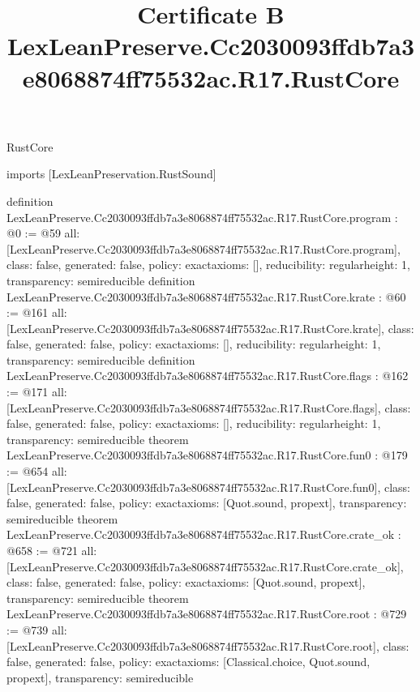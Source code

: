\begin{lexlean}{RustCore}
\title{Certificate B LexLeanPreserve.Cc2030093ffdb7a3e8068874ff75532ac.R17.RustCore}
\begin{coremodule}
imports [LexLeanPreservation.RustSound]

definition LexLeanPreserve.Cc2030093ffdb7a3e8068874ff75532ac.R17.RustCore.program : @0 := @59 {
  all: [LexLeanPreserve.Cc2030093ffdb7a3e8068874ff75532ac.R17.RustCore.program],
  class: false,
  generated: false,
  policy: exact{axioms: []},
  reducibility: regular{height: 1},
  transparency: semireducible
}
definition LexLeanPreserve.Cc2030093ffdb7a3e8068874ff75532ac.R17.RustCore.krate : @60 := @161 {
  all: [LexLeanPreserve.Cc2030093ffdb7a3e8068874ff75532ac.R17.RustCore.krate],
  class: false,
  generated: false,
  policy: exact{axioms: []},
  reducibility: regular{height: 1},
  transparency: semireducible
}
definition LexLeanPreserve.Cc2030093ffdb7a3e8068874ff75532ac.R17.RustCore.flags : @162 := @171 {
  all: [LexLeanPreserve.Cc2030093ffdb7a3e8068874ff75532ac.R17.RustCore.flags],
  class: false,
  generated: false,
  policy: exact{axioms: []},
  reducibility: regular{height: 1},
  transparency: semireducible
}
theorem LexLeanPreserve.Cc2030093ffdb7a3e8068874ff75532ac.R17.RustCore.fun0 : @179 := @654 {
  all: [LexLeanPreserve.Cc2030093ffdb7a3e8068874ff75532ac.R17.RustCore.fun0],
  class: false,
  generated: false,
  policy: exact{axioms: [Quot.sound, propext]},
  transparency: semireducible
}
theorem LexLeanPreserve.Cc2030093ffdb7a3e8068874ff75532ac.R17.RustCore.crate_ok : @658 := @721 {
  all: [LexLeanPreserve.Cc2030093ffdb7a3e8068874ff75532ac.R17.RustCore.crate_ok],
  class: false,
  generated: false,
  policy: exact{axioms: [Quot.sound, propext]},
  transparency: semireducible
}
theorem LexLeanPreserve.Cc2030093ffdb7a3e8068874ff75532ac.R17.RustCore.root : @729 := @739 {
  all: [LexLeanPreserve.Cc2030093ffdb7a3e8068874ff75532ac.R17.RustCore.root],
  class: false,
  generated: false,
  policy: exact{axioms: [Classical.choice, Quot.sound, propext]},
  transparency: semireducible
}


\end{coremodule}
\end{lexlean}
